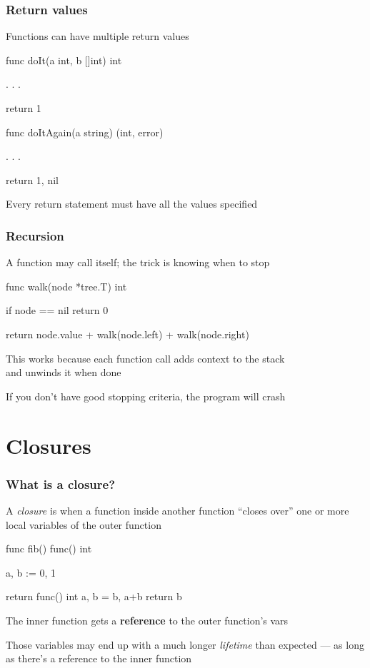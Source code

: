 \documentclass[handout,compress,t,11pt]{beamer}
\begin{document}
\begin{frame}[fragile]
    \frametitle{Return values}
    Functions can have multiple return values
\begin{golang}
func doIt(a int, b []int) int {
    . . .

    return 1
}

func doItAgain(a string) (int, error) {
	. . .

    return 1, nil
}
\end{golang}
\vspace{\baselineskip}
Every return statement must have all the values specified
\end{frame}

\begin{frame}[fragile]
    \frametitle{Recursion}
    A function may call itself; the trick is knowing when to stop
\begin{golang}
func walk(node *tree.T) int {
    if node == nil {
        return 0
    }

    return node.value + walk(node.left) + walk(node.right)
}
\end{golang}
\vspace{2\baselineskip}
This works because each function call adds context to the stack\\
and unwinds it when done \par
\vspace{0.4\baselineskip}
If you don't have good stopping criteria, the program will crash
\end{frame}


\section{Closures}

\begin{frame}[fragile]
    \frametitle{What is a closure?}
    A {\em closure} is when a function inside another function ``closes over'' one or
    more local variables of the outer function \par
\begin{golang}
func fib() func() int {
	a, b := 0, 1

	return func() int {
		a, b = b, a+b
		return b
	}
}
\end{golang}
\vspace{0.4\baselineskip}
The inner function gets a {\bf reference} to the outer function's vars \par
\vspace{0.4\baselineskip}
Those variables may end up with a much longer {\em lifetime} than expected --- as
long as there's a reference to the inner function
\end{frame}
\end{document}
